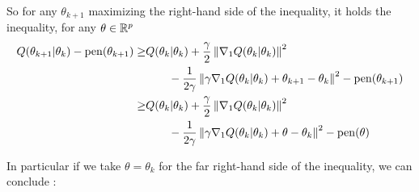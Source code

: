 \documentclass[a4paper]{article}
\begin{document}
\begin{myText}
\begin{dem}
    So for any $\theta_{k+1}$ maximizing the right-hand side of the inequality, it holds the inequality, for any $\theta\in\mathbb R^p$
    \begin{align*}
        Q(\theta_{k+1}|\theta_k) -\mathrm{pen}(\theta_{k+1}) 
        \geq & Q(\theta_k|\theta_k) 
                   + \frac \gamma2 \left\|\nabla_1 Q(\theta_k|\theta_k)\right\|^2 
                   \\ &\qquad - \frac 1{2\gamma}\left\|\gamma \nabla_1 Q(\theta_k|\theta_k) + \theta_{k+1} - \theta_k\right\|^2 -\mathrm{pen}(\theta_{k+1})
   \\   \geq & Q(\theta_k|\theta_k) 
                   + \frac \gamma2 \left\|\nabla_1 Q(\theta_k|\theta_k)\right\|^2 
                   \\ &\qquad - \frac 1{2\gamma}\left\|\gamma \nabla_1 Q(\theta_k|\theta_k) + \theta - \theta_k\right\|^2 -\mathrm{pen}(\theta)
    \end{align*}

    In particular if we take $\theta = \theta_k$ for the far right-hand side of the inequality, we can conclude : 

    \begin{center}
    \end{center}
    
\end{dem}














\end{myText}

    \newpage
    \printbibliography
\end{document}
